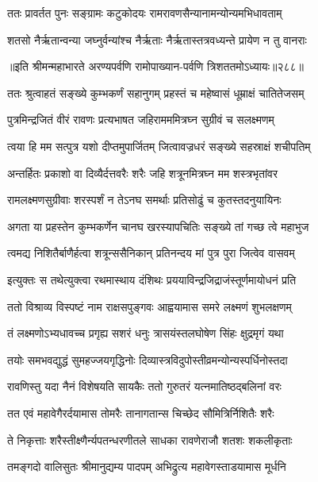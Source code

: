 \twolineshloka
{ततः प्रावर्तत पुनः सङ्ग्रामः कटुकोदयः}
{रामरावणसैन्यानामन्योन्यमभिधावताम्}


\twolineshloka
{शतसो नैर्ऋतान्वन्या जघ्नुर्वन्यांश्च नैर्ऋताः}
{नैर्ऋतास्तत्रवध्यन्ते प्रायेण न तु वानराः}


॥इति श्रीमन्महाभारते अरण्यपर्वणि रामोपाख्यान-पर्वणि त्रिशततमोऽध्यायः॥२८८॥




\twolineshloka
{ततः श्रुत्वाहतं सङ्ख्ये कुम्भकर्णं सहानुगम्}
{प्रहस्तं च महेष्वासं धूम्राक्षं चातितेजसम्}


\twolineshloka
{पुत्रमिन्द्रजितं वीरं रावणः प्रत्यभाषत}
{जहिरामममित्रघ्न सुग्रीवं च सलक्ष्मणम्}


\twolineshloka
{त्वया हि मम सत्पुत्र यशो दीप्तमुपार्जितम्}
{जित्वावज्रधरं सङ्ख्ये सहस्राक्षं शचीपतिम्}


\twolineshloka
{अन्तर्हितः प्रकाशो वा दिव्यैर्दत्तवरैः शरैः}
{जहि शत्रूनमित्रघ्न मम शस्त्रभृतांवर}


\twolineshloka
{रामलक्ष्मणसुग्रीवाः शरस्पर्शं न तेऽनघ}
{समर्थाः प्रतिसोढुं च कुतस्तदनुयायिनः}


\twolineshloka
{अगता या प्रहस्तेन कुम्भकर्णेन चानघ}
{खरस्यापचितिः सङ्ख्ये तां गच्छ त्वे महाभुज}


\twolineshloka
{त्वमद्य निशितैर्बाणैर्हत्वा शत्रून्ससैनिकान्}
{प्रतिनन्दय मां पुत्र पुरा जित्वेव वासवम्}


\twolineshloka
{इत्युक्तः स तथेत्युक्त्वा रथमास्थाय दंशिथः}
{प्रययाविन्द्रजिद्राजंस्तूर्णमायोधनं प्रति}


\twolineshloka
{ततो विश्राव्य विस्पष्टं नाम राक्षसपुङ्गवः}
{आह्वयामास समरे लक्ष्मणं शुभलक्षणम्}


\twolineshloka
{तं लक्ष्मणोऽभ्यधावच्च प्रगृह्य सशरं धनुः}
{त्रासयंस्तलघोषेण सिंहः क्षुद्रमृगं यथा}


\twolineshloka
{तयोः समभवद्युद्धं सुमहज्जयगृद्धिनोः}
{दिव्यास्त्रविदुपोस्तीव्रमन्योन्यस्पर्धिनोस्तदा}


\twolineshloka
{रावणिस्तु यदा नैनं विशेषयति सायकैः}
{ततो गुरुतरं यत्नमातिष्ठद्बलिनां वरः}


\twolineshloka
{तत एवं महावेगैरर्दयामास तोमरैः}
{तानागतान्स चिच्छेद सौमित्रिर्निशितैः शरैः}


\twolineshloka
{ते निकृत्ताः शरैस्तीक्ष्णैर्न्यपतन्धरणीतले}
{साधका रावणेराजौ शतशः शकलीकृताः}


\twolineshloka
{तमङ्गदो वालिसुतः श्रीमानुद्यम्य पादपम्}
{अभिद्रुत्य महावेगस्ताडयामास मूर्धनि}


